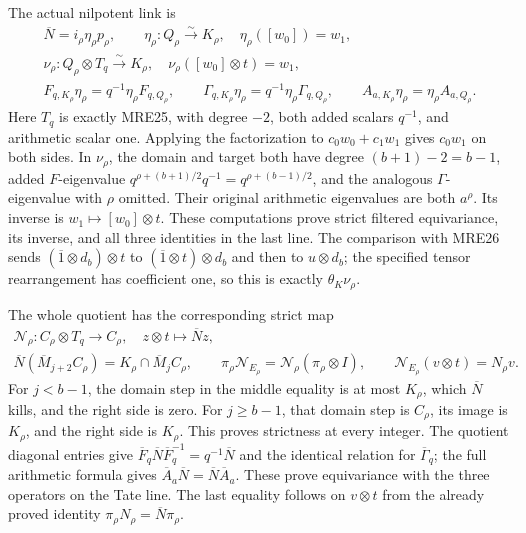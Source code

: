 The actual nilpotent link is
\[
 \begin{gathered}
 \overline N=i_\rho\eta_\rho p_\rho,\qquad
 \eta_\rho:Q_\rho\xrightarrow{\sim}K_\rho,\quad
                         \eta_\rho([w_0])=w_1,\\
 \nu_\rho:Q_\rho\otimes T_q\xrightarrow{\sim}K_\rho,\quad
                         \nu_\rho([w_0]\otimes t)=w_1,\\
 F_{q,K_\rho}\eta_\rho=q^{-1}\eta_\rho F_{q,Q_\rho},\qquad
 \Gamma_{q,K_\rho}\eta_\rho
                       =q^{-1}\eta_\rho\Gamma_{q,Q_\rho},\qquad
 A_{a,K_\rho}\eta_\rho=\eta_\rho A_{a,Q_\rho}.
 \end{gathered}
 \tag{MRE38}
\]
Here \(T_q\) is exactly MRE25, with degree \(-2\), both added
scalars \(q^{-1}\), and arithmetic scalar one. Applying the
factorization to \(c_0w_0+c_1w_1\) gives \(c_0w_1\) on both
sides. In \(\nu_\rho\), the domain and target both have degree
\((b+1)-2=b-1\), added \(F\)-eigenvalue
\(q^{\rho+(b+1)/2}q^{-1}=q^{\rho+(b-1)/2}\), and the analogous
\(\Gamma\)-eigenvalue with \(\rho\) omitted. Their original
arithmetic eigenvalues are both \(a^\rho\). Its inverse is
\(w_1\mapsto[w_0]\otimes t\). These computations prove strict
filtered equivariance, its inverse, and all three identities in
the last line. The comparison with MRE26 sends
\((\overline1\otimes d_b)\otimes t\) to
\((\overline1\otimes t)\otimes d_b\) and then to
\(u\otimes d_b\); the specified tensor rearrangement has
coefficient one, so this is exactly \(\theta_K\nu_\rho\).

The whole quotient has the corresponding strict map
\[
 \begin{gathered}
 \mathcal N_\rho:C_\rho\otimes T_q\longrightarrow C_\rho,
                  \quad z\otimes t\longmapsto\overline Nz,\\
 \overline N(\overline M_{j+2}C_\rho)
             =K_\rho\cap\overline M_jC_\rho,\qquad
 \pi_\rho\mathcal N_{E_\rho}
             =\mathcal N_\rho(\pi_\rho\otimes I),\qquad
 \mathcal N_{E_\rho}(v\otimes t)=N_\rho v.
 \end{gathered}
 \tag{MRE39}
\]
For \(j<b-1\), the domain step in the middle equality is at most
\(K_\rho\), which \(\overline N\) kills, and the right side is
zero. For \(j\geq b-1\), that domain step is \(C_\rho\), its
image is \(K_\rho\), and the right side is \(K_\rho\).
This proves strictness at every integer. The quotient diagonal
entries give \(\overline F_q\overline N\overline F_q^{-1}
=q^{-1}\overline N\) and the identical relation for
\(\overline\Gamma_q\); the full arithmetic formula gives
\(\overline A_a\overline N=\overline N\overline A_a\).
These prove equivariance with the three operators on the Tate
line. The last equality follows on \(v\otimes t\) from the
already proved identity \(\pi_\rho N_\rho=\overline N\pi_\rho\).

